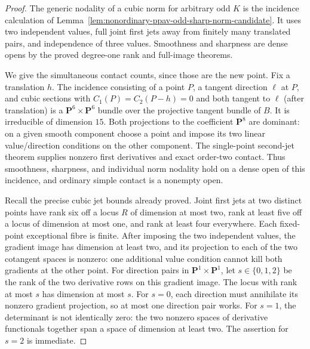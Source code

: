 \begin{proof}
The generic nodality of a cubic norm for arbitrary odd $K$ is the
incidence calculation of
Lemma~\ref{lem:nonordinary-ppav-odd-sharp-norm-candidate}.
It uses two independent values, full joint first jets away from
finitely many translated pairs, and independence of three values.
Smoothness and sharpness are dense opens by the proved degree-one
rank and full-image theorems.

We give the simultaneous contact counts, since those are the new
point. Fix a translation $h$. The incidence consisting of a point
$P$, a tangent direction $\ell$ at $P$, and cubic sections with
$C_1(P)=C_2(P-h)=0$ and both tangent to $\ell$ (after translation)
is a $\mathbf P^6\times\mathbf P^6$ bundle over the projective
tangent bundle of $B$. It is irreducible of dimension $15$.
Both projections to the coefficient $\mathbf P^8$ are dominant:
on a given smooth component choose a point and impose its two
linear value/direction conditions on the other component.
The single-point second-jet theorem supplies nonzero first
derivatives and exact order-two contact. Thus smoothness, sharpness, and individual norm nodality hold on a dense open of
this incidence, and ordinary simple contact is a nonempty open.

Recall the precise cubic jet bounds already proved. Joint first
jets at two distinct points have rank six off a locus $R$ of
dimension at most two, rank at least five off a locus of dimension
at most one, and rank at least four everywhere. Each fixed-point
exceptional fibre is finite. After imposing the two independent
values, the gradient image has dimension at least two, and its
projection to each of the two cotangent spaces is nonzero: one
additional value condition cannot kill both gradients at the other
point. For direction pairs in $\mathbf P^1\times\mathbf P^1$,
let $s\in\{0,1,2\}$ be the rank of the two derivative rows on this
gradient image. The locus with rank at most $s$ has dimension at
most $s$. For $s=0$, each direction must annihilate its nonzero
gradient projection, so at most one direction pair works. For
$s=1$, the determinant is not identically zero: the two nonzero
spaces of derivative functionals together span a space of dimension
at least two. The assertion for $s=2$ is immediate.


\end{proof}
